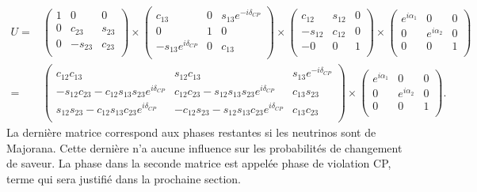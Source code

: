         \begin{eqnarray}\label{eq::pmns1}
          U= & 
          \left(\begin{matrix}
            1   &    0    &    0   \\
            0   & c_{23}  & s_{23} \\
            0   & -s_{23} & c_{23} \\
          \end{matrix}\right)\times
          \left(\begin{matrix}
            c_{13}  &    0    & s_{13}e^{-i\delta_{CP}} \\
            0   &    1    &    0   \\
            -s_{13}e^{i\delta_{CP}} &    0    & c_{13} \\
          \end{matrix}\right)\times
          \left(\begin{matrix}
            c_{12}  & s_{12}  &    0   \\
            -s_{12} & c_{12}  &    0   \\
            -                    0   &    0    &    1   \\
          \end{matrix}\right)\times
          \left(\begin{matrix}
            e^{i\alpha_1} &    0    &    0   \\
            0   & e^{i\alpha_2} & 0 \\
            0   & 0 & 1 \\
          \end{matrix}\right) \\\label{eq::pmns}
          =& 
          \left(\begin{matrix}
            c_{12}c_{13}                                    & s_{12}c_{13}                                    & s_{13}e^{-i\delta_{CP}} \\
            -s_{12}c_{23}-c_{12}s_{13}s_{23}e^{i\delta_{CP}} & c_{12}c_{23}-s_{12}s_{13}s_{23}e^{i\delta_{CP}} & c_{13}s_{23} \\
            s_{12}s_{23}-c_{12}s_{13}c_{23}e^{i\delta_{CP}} & -c_{12}s_{23}-s_{12}s_{13}c_{23}e^{i\delta_{CP}} & c_{13}c_{23} \\
          \end{matrix}\right)\times
          \left(\begin{matrix}
            e^{i\alpha_1} &    0    &    0   \\
            0   & e^{i\alpha_2} & 0 \\
            0   & 0 & 1 \\
          \end{matrix}\right) .
        \end{eqnarray}
        La dernière matrice correspond aux phases restantes si les neutrinos sont de Majorana. Cette dernière n'a aucune influence sur les probabilités de changement de saveur. La phase dans la seconde matrice est appelée phase de violation CP, terme qui sera justifié dans la prochaine section. %


